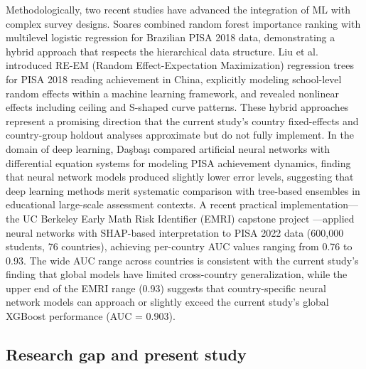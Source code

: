 \documentclass[pdflatex,sn-mathphys-ay]{sn-jnl}
\begin{document}
Methodologically, two recent studies have advanced the integration of ML with complex survey designs. Soares \citep{Soares_2024_brazil} combined random forest importance ranking with multilevel logistic regression for Brazilian PISA 2018 data, demonstrating a hybrid approach that respects the hierarchical data structure. Liu et al. \citep{Liu_2024_REEM} introduced RE-EM (Random Effect-Expectation Maximization) regression trees for PISA 2018 reading achievement in China, explicitly modeling school-level random effects within a machine learning framework, and revealed nonlinear effects including ceiling and S-shaped curve patterns. These hybrid approaches represent a promising direction that the current study's country fixed-effects and country-group holdout analyses approximate but do not fully implement. In the domain of deep learning, Daşbaşı \citep{Dasbasi_2025_dynamic} compared artificial neural networks with differential equation systems for modeling PISA achievement dynamics, finding that neural network models produced slightly lower error levels, suggesting that deep learning methods merit systematic comparison with tree-based ensembles in educational large-scale assessment contexts. A recent practical implementation---the UC Berkeley Early Math Risk Identifier (EMRI) capstone project \citep{EMRI_2025}---applied neural networks with SHAP-based interpretation to PISA 2022 data (600,000 students, 76 countries), achieving per-country AUC values ranging from 0.76 to 0.93. The wide AUC range across countries is consistent with the current study's finding that global models have limited cross-country generalization, while the upper end of the EMRI range (0.93) suggests that country-specific neural network models can approach or slightly exceed the current study's global XGBoost performance (AUC = 0.903).

\FloatBarrier
\subsection{Research gap and present study}
\end{document}
